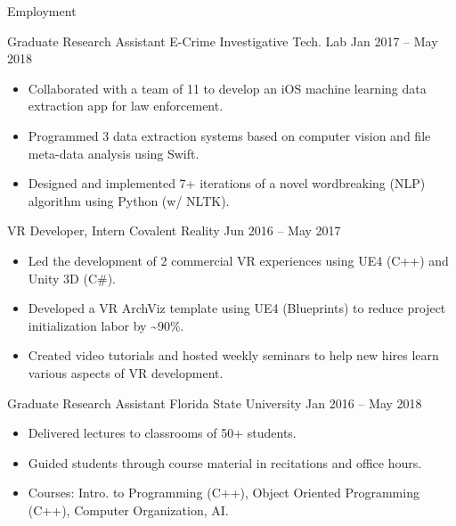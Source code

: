 \documentclass[]{mcdowellcv}
\begin{document}
	\makeheader
	
	\begin{cvsection}{Employment}
		\begin{cvsubsection} {Graduate Research Assistant} {E-Crime Investigative Tech. Lab} {Jan 2017 -- May 2018}
			\begin{itemize}
				\item Collaborated with a team of 11 to develop an iOS machine learning data extraction app for law enforcement.
				\item Programmed 3 data extraction systems based on computer vision and file meta-data analysis using Swift.
				\item Designed and implemented 7+ iterations of a novel wordbreaking (NLP) algorithm using Python (w/ NLTK).
			\end{itemize}
		\end{cvsubsection}
		
		\begin{cvsubsection} {VR Developer, Intern} {Covalent Reality} {Jun 2016 -- May 2017}
			\begin{itemize}
				\item Led the development of 2 commercial VR experiences using UE4 (C++) and Unity 3D (C\#).
				\item Developed a VR ArchViz template using UE4 (Blueprints) to reduce project initialization labor by \~{}90\%.
				\item Created video tutorials and hosted weekly seminars to help new hires learn various aspects of VR development.
			\end{itemize}
		\end{cvsubsection}
		
		\begin{cvsubsection} {Graduate Research Assistant} {Florida State University} {Jan 2016 -- May 2018}
			\begin{itemize}
				\item Delivered lectures to classrooms of 50+ students.
				\item Guided students through course material in recitations and office hours.
				\item Courses: Intro. to Programming (C++), Object Oriented Programming (C++), Computer Organization, AI.
			\end{itemize}
		\end{cvsubsection}
	\end{cvsection}
	
\end{document}
